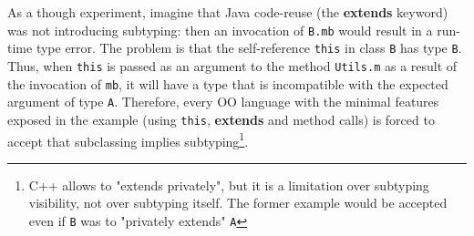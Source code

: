 As a though experiment, imagine that Java code-reuse (the {\bf extends} keyword) was not introducing subtyping: then an invocation of 
\lstinline{B.mb} would result in a run-time type error.
The problem is that the
self-reference \lstinline{this} in class \lstinline{B} has 
type \lstinline{B}. Thus, when \lstinline{this} is passed as an argument to 
the method \lstinline{Utils.m} as a result of the invocation of
\lstinline{mb}, it will have a type that is incompatible with the
expected argument of type \lstinline{A}.  
Therefore, every OO language with the minimal features exposed in the example (using \lstinline{this},
{\bf extends} and method calls) is forced to accept that subclassing implies
subtyping\footnote{C++ allows to "extends privately", but it is a limitation over
  subtyping visibility, not over subtyping itself.  The
  former example would be accepted even if \lstinline{B} was to
  "privately extends" \lstinline{A}}.
  

